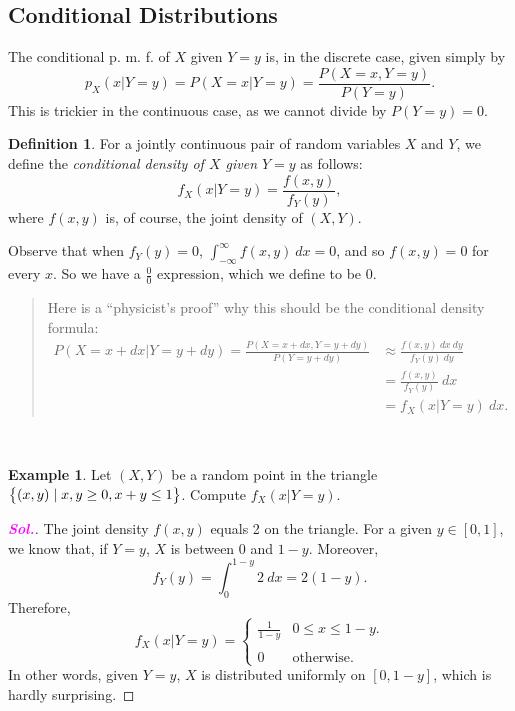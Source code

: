 \documentclass[12pt,a4paper]{article}
\theoremstyle{definition}
\newtheorem{example}{Example}[section]
\theoremstyle{definition}
\newtheorem*{definition}{Definition}
\theoremstyle{definition}
\theoremstyle{definition}
\theoremstyle{remark}
\theoremstyle{definition}
\newcommand{\dispsty}{\displaystyle}
\newcommand{\sol}{\textcolor{magenta}{\bf \textit{Sol.}}\quad}
\begin{document}
\subsection{Conditional Distributions}
The conditional p. m. f. of $X$ given $Y=y$ is, in the discrete case, given simply by \[
p_X(x|Y=y)=P(X=x|Y=y)=\frac{P(X=x,Y=y)}{P(Y=y)}.
\] This is trickier in the continuous case, as we cannot divide by $P(Y=y)=0$.
\\
\begin{tcolorbox}[colback=white]
	\begin{definition}
		For a jointly continuous pair of random variables $X$ and $Y$, we define the \textit{conditional density of $X$ given $Y=y$} as follows: \[
		f_X(x|Y=y)=\frac{f(x,y)}{f_Y(y)},
		\] where $f(x,y)$ is, of course, the joint density of $(X,Y)$.
	\end{definition}
\end{tcolorbox} Observe that when $f_Y(y)=0$, $\dispsty\int_{-\infty}^\infty f(x,y)\ dx =0$, and so $f(x,y)=0$ for every $x$. So we have a $\dispsty\frac{0}{0}$ expression, which we define to be 0.\begin{quote}
	Here is a ``physicist's proof'' why this should be the conditional density formula: \begin{align*}
	P(X=x+dx|Y=y+dy)=\frac{P(X=x+dx, Y=y+dy)}{P(Y=y+dy)}&\approx\frac{f(x,y)\ dx\ dy}{f_Y(y)\ dy}\\
	&=\frac{f(x,y)}{f_Y(y)}\ dx\\
	&=f_X(x|Y=y)\ dx.
	\end{align*}
\end{quote}
\
\begin{example}
	Let $(X,Y)$ be a random point in the triangle $\set{(x,y)\mid x,y\geq 0, x+y\leq 1}$. Compute $f_X(x|Y=y)$. \begin{proof}[\sol]
		The joint density $f(x,y)$ equals 2 on the triangle. For a given $y\in[0,1]$, we know that, if $Y=y$, $X$ is between 0 and $1-y$. Moreover, \[
		f_Y(y)=\int_0^{1-y}2\ dx=2(1-y).
		\] Therefore, \[
		f_X(x|Y=y)=\begin{cases}
		\dispsty\frac{1}{1-y} &0\leq x\leq 1-y.\\
		\\
		0 &\text{otherwise}.
		\end{cases}
		\] In other words, given $Y=y$, $X$ is distributed uniformly on $[0,1-y]$, which is hardly surprising.
	\end{proof}
\end{example}
\
\end{document}
